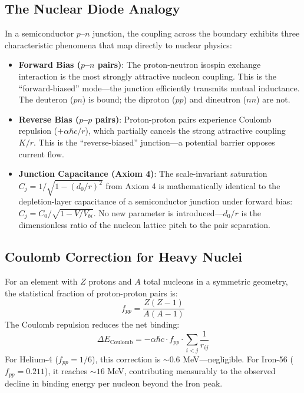 \subsection{The Nuclear Diode Analogy}
In a semiconductor $p$--$n$ junction, the coupling across the boundary exhibits three characteristic phenomena that map directly to nuclear physics:
\begin{itemize}
    \item \textbf{Forward Bias ($p$--$n$ pairs)}: The proton-neutron isospin exchange interaction is the most strongly attractive nucleon coupling. This is the ``forward-biased'' mode---the junction efficiently transmits mutual inductance. The deuteron ($pn$) is bound; the diproton ($pp$) and dineutron ($nn$) are not.
    \item \textbf{Reverse Bias ($p$--$p$ pairs)}: Proton-proton pairs experience Coulomb repulsion ($+\alpha\hbar c / r$), which partially cancels the strong attractive coupling $K/r$. This is the ``reverse-biased'' junction---a potential barrier opposes current flow.
    \item \textbf{Junction Capacitance (Axiom 4)}: The scale-invariant saturation $C_j = 1/\sqrt{1 - (d_0/r)^2}$ from Axiom 4 is mathematically identical to the depletion-layer capacitance of a semiconductor junction under forward bias: $C_j = C_0 / \sqrt{1 - V/V_{bi}}$. No new parameter is introduced---$d_0/r$ is the dimensionless ratio of the nucleon lattice pitch to the pair separation.
\end{itemize}

\subsection{Coulomb Correction for Heavy Nuclei}
For an element with $Z$ protons and $A$ total nucleons in a symmetric geometry, the statistical fraction of proton-proton pairs is:
\begin{equation}
    f_{pp} = \frac{Z(Z-1)}{A(A-1)}
\end{equation}
The Coulomb repulsion reduces the net binding:
\begin{equation}
    \Delta E_{\text{Coulomb}} = -\alpha\hbar c \cdot f_{pp} \cdot \sum_{i<j} \frac{1}{r_{ij}}
    \label{eq:coulomb_correction}
\end{equation}
For Helium-4 ($f_{pp} = 1/6$), this correction is $\sim 0.6$ MeV---negligible. For Iron-56 ($f_{pp} = 0.211$), it reaches $\sim 16$ MeV, contributing measurably to the observed decline in binding energy per nucleon beyond the Iron peak.

